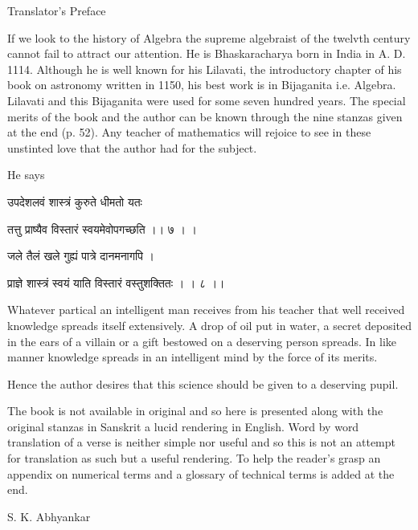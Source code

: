 \documentclass[]{article}
\date{}
\begin{document}
{Translator's Preface}

{If we look to the history of Algebra the supreme algebraist of the
twelvth century cannot fail to attract our attention. He is
Bhaskaracharya born in India in A. D. 1114. Although he is well known
for his Lilavati, the introductory chapter of his book on astronomy
written in 1150, his best work is in Bijaganita i.e. Algebra. Lilavati
and this Bijaganita were used for some seven hundred years. The special
merits of the book and the author can be known through the nine stanzas
given at the end (p. 52). Any teacher of mathematics will rejoice to see
in these unstinted love that the author had for the subject.}

{He says}

{उपदेशलवं शास्त्रं कुरुते धीमतो यतः }

{तत्तु प्राष्यैव विस्तारं स्वयमेवोपगच्छति ।। ७ । । }

{जले तैलं खले गुह्यं पात्रे दानमनागपि । }

{प्राज्ञे शास्त्रं स्वयं याति विस्तारं वस्तुशक्तितः । । ८ ।। }

{Whatever partical an intelligent man receives from his teacher that
well received knowledge spreads itself extensively. A drop of oil put in
water, a secret deposited in the ears of a villain or a gift bestowed on
a deserving person spreads. In like manner knowledge spreads in an
intelligent mind by the force of its merits.}

{Hence the author desires that this science should be given to a
deserving pupil.}

{The book is not available in original and so here is presented along
with the original stanzas in Sanskrit a lucid rendering in English. Word
by word translation of a verse is neither simple nor useful and so this
is not an attempt for translation as such but a useful rendering. To
help the reader's grasp an appendix on numerical terms and a glossary of
technical terms is added at the end.}

{S. K. Abhyankar\\
}
\end{document}
